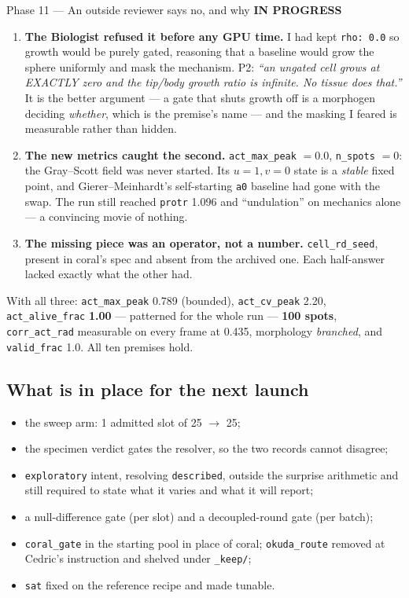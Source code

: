 \documentclass[11pt,a4paper]{article}
\newcommand{\code}[1]{\texttt{#1}}
\newcommand{\prog}{\textcolor{warn}{\textbf{IN PROGRESS}}}
\begin{document}
\begin{phasebox}{Phase 11 --- An outside reviewer says no, and why \hfill \prog}
\begin{enumerate}\itemsep2pt
\item \textbf{The Biologist refused it before any GPU time.} I had kept \code{rho: 0.0} so growth
      would be purely gated, reasoning that a baseline would grow the sphere uniformly and mask the
      mechanism. P2: \emph{``an ungated cell grows at EXACTLY zero and the tip/body growth ratio is
      infinite. No tissue does that.''} It is the better argument --- a gate that shuts growth off
      is a morphogen deciding \emph{whether}, which is the premise's name --- and the masking I
      feared is measurable rather than hidden.
\item \textbf{The new metrics caught the second.} \code{act\_max\_peak} $=0.0$,
      \code{n\_spots} $=0$: the Gray--Scott field was never started. Its $u=1,v=0$ state is a
      \emph{stable} fixed point, and Gierer--Meinhardt's self-starting \code{a0} baseline had gone
      with the swap. The run still reached \code{protr} 1.096 and ``undulation'' on mechanics
      alone --- a convincing movie of nothing.
\item \textbf{The missing piece was an operator, not a number.} \code{cell\_rd\_seed}, present in
      coral's spec and absent from the archived one. Each half-answer lacked exactly what the
      other had.
\end{enumerate}

\noindent With all three: \code{act\_max\_peak} 0.789 (bounded), \code{act\_cv\_peak} 2.20,
\code{act\_alive\_frac} \textbf{1.00} --- patterned for the whole run --- \textbf{100 spots},
\code{corr\_act\_rad} measurable on every frame at 0.435, morphology \emph{branched}, and
\code{valid\_frac} 1.0. All ten premises hold.

\subsection*{What is in place for the next launch}
\begin{itemize}\itemsep2pt
\item the sweep arm: 1 admitted slot of 25 $\to$ 25;
\item the specimen verdict gates the resolver, so the two records cannot disagree;
\item \code{exploratory} intent, resolving \code{described}, outside the surprise arithmetic and
      still required to state what it varies and what it will report;
\item a null-difference gate (per slot) and a decoupled-round gate (per batch);
\item \code{coral\_gate} in the starting pool in place of coral; \code{okuda\_route} removed at
      Cedric's instruction and shelved under \code{\_keep/};
\item \code{sat} fixed on the reference recipe and made tunable.
\end{itemize}


\end{phasebox}
\end{document}

